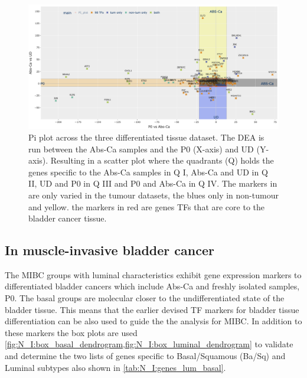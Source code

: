 \begin{figure}
    \includegraphics[width=1.0\textwidth,height=1.0\textheight,keepaspectratio]{Sections/Network_I/Resources/selective_pruning/sel_tfs/sel_tfs_pi_all_var_rect.png}
    \caption[The 98 TFs and the DEA across the non-tumour datasets]{Pi plot across the three differentiated tissue dataset. The DEA is run between the Abs-Ca samples and the P0 (X-axis) and UD (Y-axis). Resulting in a scatter plot where the quadrants (Q) holds the genes specific to the Abs-Ca samples in Q I, Abs-Ca and UD in Q II, UD and P0 in Q III and P0 and Abs-Ca in Q IV. The markers in 
    are only varied in the tumour datasets, the blues only in non-tumour and yellow. the markers in red are genes TFs that are core to the bladder cancer tissue. }
    \label{fig:N_I:pi_sel_tfs_var}
\end{figure}

\newpage


\subsection{In muscle-invasive bladder cancer} \label{s:N_I:sel_tfs_cancer}


The MIBC groups with luminal characteristics exhibit gene expression markers to differentiated bladder cancers which include Abs-Ca and freshly isolated samples, P0. The basal groups are molecular closer to the undifferentiated state of the bladder tissue. This means that the earlier devised TF markers for bladder tissue differentiation can be also used to guide the the analysis for MIBC. In addition to these markers the box plots are used \cref{fig:N_I:box_basal_dendrogram,fig:N_I:box_luminal_dendrogram} to validate and determine the two lists of genes specific to Basal/Squamous (Ba/Sq) and Luminal subtypes  also shown in \cref{tab:N_I:genes_lum_basal}. 

